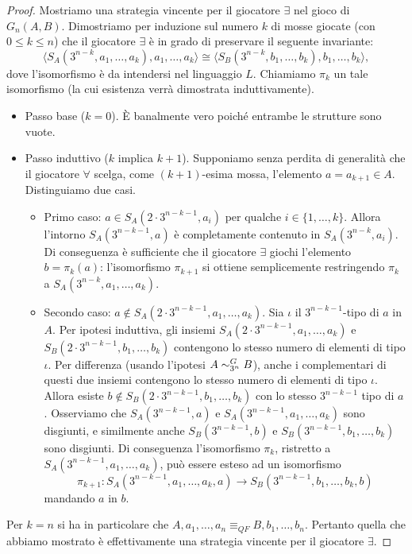 \begin{proof}
  Mostriamo una strategia vincente per il giocatore $\exists$ nel gioco di \EFl\ $G_n(A,B)$.
  Dimostriamo per induzione sul numero $k$ di mosse giocate (con $0\leq k \leq n$) che il giocatore $\exists$ è in grado di preservare il seguente invariante:
  \[ \big\langle S_A(3^{n-k}, a_1,\ldots, a_k), a_1,\ldots,a_k \big\rangle \cong \big\langle S_B(3^{n-k}, b_1,\ldots, b_k), b_1,\ldots,b_k \big\rangle, \]
  dove l'isomorfismo è da intendersi nel linguaggio $L$.
  Chiamiamo $\pi_k$ un tale isomorfismo (la cui esistenza verrà dimostrata induttivamente).
  \begin{itemize}
    \item Passo base ($k=0$). È banalmente vero poiché entrambe le strutture sono vuote.
    \item Passo induttivo ($k$ implica $k+1$). Supponiamo senza perdita di generalità che il giocatore $\forall$ scelga, come $(k+1)$-esima mossa, l'elemento $a=a_{k+1}\in A$.
    Distinguiamo due casi.
    \begin{itemize}
      \item Primo caso: $a\in S_A(2\cdot 3^{n-k-1}, a_i)$ per qualche $i\in\{1,\dots,k\}$. Allora l'intorno $S_A(3^{n-k-1},a)$ è completamente contenuto in $S_A(3^{n-k}, a_i)$.
      Di conseguenza è sufficiente che il giocatore $\exists$ giochi l'elemento $b=\pi_k(a)$: l'isomorfismo $\pi_{k+1}$ si ottiene semplicemente restringendo $\pi_k$ a $S_A(3^{n-k}, a_1,\ldots, a_k)$.
      
      \item Secondo caso: $a\not\in S_A(2\cdot 3^{n-k-1}, a_1,\ldots, a_k)$.
      Sia $\iota$ il $3^{n-k-1}$-tipo di $a$ in $A$.
      Per ipotesi induttiva, gli insiemi $S_A(2\cdot 3^{n-k-1}, a_1,\ldots, a_k)$ e $S_B(2\cdot 3^{n-k-1}, b_1,\dots,b_k)$ contengono lo stesso numero di elementi di tipo $\iota$.
      Per differenza (usando l'ipotesi $A\sim^{G}_{3^n} B$), anche i complementari di questi due insiemi contengono lo stesso numero di elementi di tipo $\iota$.
      Allora esiste $b\not\in S_B(2\cdot 3^{n-k-1}, b_1,\dots,b_k)$ con lo stesso $3^{n-k-1}$ tipo di $a$.
      Osserviamo che $S_A(3^{n-k-1}, a)$ e $S_A(3^{n-k-1}, a_1,\ldots, a_k)$ sono disgiunti, e similmente anche $S_B(3^{n-k-1}, b)$ e $S_B(3^{n-k-1}, b_1,\ldots, b_k)$ sono disgiunti.
      Di conseguenza l'isomorfismo $\pi_k$, ristretto a $S_A(3^{n-k-1}, a_1,\ldots, a_k)$, può essere esteso ad un isomorfismo
      \[ \pi_{k+1}\colon S_A(3^{n-k-1}, a_1,\ldots, a_k,a) \to S_B(3^{n-k-1}, b_1,\ldots, b_k, b) \]
      mandando $a$ in $b$.
    \end{itemize}
  \end{itemize}
  Per $k=n$ si ha in particolare che $A,a_1,\dots,a_n \equiv_{QF} B, b_1,\dots,b_n$. Pertanto quella che abbiamo mostrato è effettivamente una strategia vincente per il giocatore $\exists$.
\end{proof}



